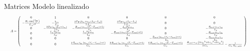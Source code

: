 \documentclass[a4paper, 10pt, onecolumn,journal]{ieeeconf}
\begin{document}
Matrices Modelo linealizado
\begin{equation*}\label{eq:matriz_A}
\resizebox{\textwidth}{!}{
$A = \left(\begin{array}{cccccc} 
0 & 1 & 0 & 0 & 0 & 0\\ 
-\frac{K_{l}\,\cos\left(\frac{\theta _{m}}{r}\right)}{J_{\mathrm{eq}}\,r^2} & -\frac{b_{\mathrm{eq}}}{J_{\mathrm{eq}}} & \frac{3\,\mathrm{Pp}\,\left(\lambda _{m}+i_{\mathrm{ds}}\,\left(L_{d}-L_{q}\right)\right)}{2\,J_{\mathrm{eq}}} & \frac{3\,\mathrm{Pp}\,i_{\mathrm{qs}}\,\left(L_{d}-L_{q}\right)}{2\,J_{\mathrm{eq}}} & 0 & 0\\ 
0 & -\frac{3\,\mathrm{Pp}\,i_{\mathrm{ds}}\,\left(L_{d}+\lambda _{m}\right)}{2\,L_{q}} & -\frac{R_{\mathrm{sref}}\,\left(\alpha _{\mathrm{cu}}\,\left(T_{s}-T_{\mathrm{sref}}\right)+1\right)}{L_{q}} & -\frac{L_{d}\,\mathrm{Pp}\,\omega _{m}}{L_{q}} & 0 & -\frac{R_{\mathrm{sref}}\,\alpha _{\mathrm{cu}}\,i_{\mathrm{qs}}}{L_{q}}\\ 
0 & \frac{L_{q}\,\mathrm{Pp}\,i_{\mathrm{qs}}}{L_{d}} & \frac{L_{q}\,\mathrm{Pp}\,\omega _{m}}{L_{d}} & -\frac{R_{\mathrm{sref}}\,\left(\alpha _{\mathrm{cu}}\,\left(T_{s}-T_{\mathrm{sref}}\right)+1\right)}{L_{d}} & 0 & -\frac{R_{\mathrm{sref}}\,\alpha _{\mathrm{cu}}\,i_{\mathrm{ds}}}{L_{d}}\\ 
0 & 0 & 0 & 0 & -\frac{R_{\mathrm{sref}}\,\left(\alpha _{\mathrm{cu}}\,\left(T_{s}-T_{\mathrm{sref}}\right)+1\right)}{L_{\mathrm{ls}}} & -\frac{R_{\mathrm{sref}}\,\alpha _{\mathrm{cu}}\,i_{\mathrm{os}}}{L_{\mathrm{ls}}}\\ 
0 & 0 & \frac{3\,R_{\mathrm{sref}}\,i_{\mathrm{qs}}\,\left(\alpha _{\mathrm{cu}}\,\left(T_{s}-T_{\mathrm{sref}}\right)+1\right)}{C_{\mathrm{ts}}} & \frac{3\,R_{\mathrm{sref}}\,i_{\mathrm{ds}}\,\left(\alpha _{\mathrm{cu}}\,\left(T_{s}-T_{\mathrm{sref}}\right)+1\right)}{C_{\mathrm{ts}}} & \frac{6\,R_{\mathrm{sref}}\,i_{\mathrm{os}}\,\left(\alpha _{\mathrm{cu}}\,\left(T_{s}-T_{\mathrm{sref}}\right)+1\right)}{C_{\mathrm{ts}}} & \frac{R_{\mathrm{sref}}\,\alpha _{\mathrm{cu}}\,\left(3\,{i_{\mathrm{ds}}}^2+6\,{i_{\mathrm{os}}}^2+3\,{i_{\mathrm{qs}}}^2\right)}{2\,C_{\mathrm{ts}}}-\frac{1}{C_{\mathrm{ts}}\,R_{\mathrm{ts},\mathrm{amb}}} 
\end{array}\right)$
}
\end{equation*}
\end{document}
